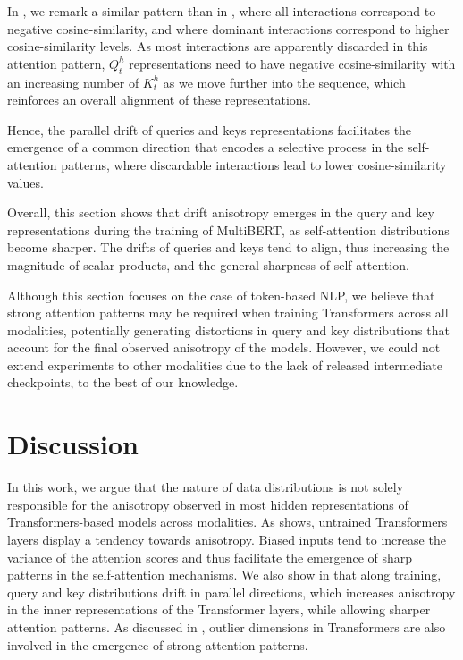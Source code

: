 In , we remark a similar pattern than in , where all interactions correspond to negative cosine-similarity, and where dominant interactions correspond to higher cosine-similarity levels. As most interactions are apparently discarded in this attention pattern, $Q^h_t$ representations need to have negative cosine-similarity with an increasing number of $K^h_t$ as we move further into the sequence, which reinforces an overall alignment of these representations.

Hence, the parallel drift of queries and keys representations facilitates the emergence of a common direction that encodes a selective process in the self-attention patterns, where discardable interactions lead to lower cosine-similarity values. 

Overall, this section shows that drift anisotropy emerges in the query and key representations during the training of MultiBERT, as self-attention distributions become sharper. The drifts of queries and keys tend to align, thus increasing the magnitude of scalar products, and the general sharpness of self-attention.

Although this section focuses on the case of token-based NLP, we believe that strong attention patterns may be required when training Transformers across all modalities, potentially generating distortions in query and key distributions that account for the final observed anisotropy of the models. However, we could not extend experiments to other modalities due to the lack of released intermediate checkpoints, to the best of our knowledge.

\section{Discussion}
\label{sec:anisotropy_discussion}

In this work, we argue that the nature of data distributions is not solely responsible for the anisotropy observed in most hidden representations of Transformers-based models across modalities. As  shows, untrained Transformers layers display a tendency towards anisotropy. Biased inputs tend to increase the variance of the attention scores and thus facilitate the emergence of sharp patterns in the self-attention mechanisms. We also show in  that along training, query and key distributions drift in parallel directions, which increases anisotropy in the inner representations of the Transformer layers, while allowing sharper attention patterns. As discussed in \citet{puccetti-etal-2022-outlier}, outlier dimensions in Transformers are also involved in the emergence of strong attention patterns.

